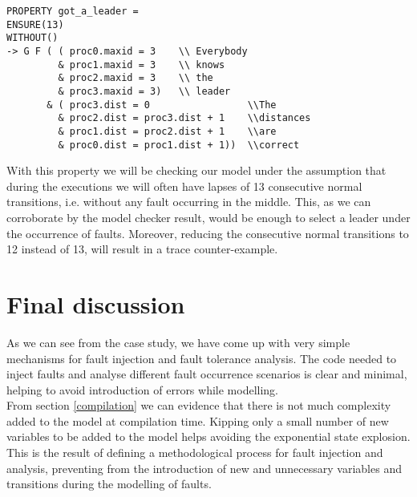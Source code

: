 \documentclass{llncs2e/llncs}
\begin{document}
\begin{shaded}
\vspace{-0.5cm}
\begin{verbatim}
PROPERTY got_a_leader =
ENSURE(13)
WITHOUT()
-> G F ( ( proc0.maxid = 3    \\ Everybody
         & proc1.maxid = 3    \\ knows
         & proc2.maxid = 3    \\ the
         & proc3.maxid = 3)   \\ leader
       & ( proc3.dist = 0                 \\The
         & proc2.dist = proc3.dist + 1    \\distances
         & proc1.dist = proc2.dist + 1    \\are
         & proc0.dist = proc1.dist + 1))  \\correct
\end{verbatim}
\vspace{-0.5cm}
\end{shaded}
\vspace{-0.3cm}
\noindent With this property we will be checking our model under the assumption that during the executions we will often have lapses of 13 consecutive normal transitions, i.e. without any fault occurring in the middle. This, as we can corroborate by the model checker result, would be enough to select a leader under the occurrence of faults. Moreover, reducing the consecutive normal transitions to 12 instead of 13, will result in a trace counter-example.


\section{Final discussion}
As we can see from the case study, we have come up with very simple mechanisms for fault injection and fault tolerance analysis. The code needed to inject faults and analyse different fault occurrence scenarios is clear and minimal, helping to avoid introduction of errors while modelling.\\
From section \ref{compilation} we can evidence that there is not much complexity added to the model at compilation time. Kipping only a small number of new variables to be added to the model helps avoiding the exponential state explosion. This is the result of defining a methodological process for fault injection and analysis, preventing from the introduction of new and unnecessary variables and transitions during the modelling of faults.\\
\end{document}

